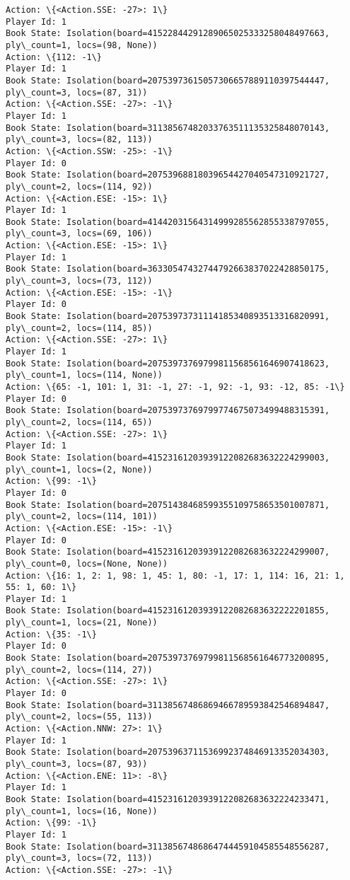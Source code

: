 \documentclass[11pt]{article}
\begin{document}
\begin{Verbatim}[commandchars=\\\{\}]
Action: \{<Action.SSE: -27>: 1\}
Player Id: 1
Book State: Isolation(board=41522844291289065025333258048497663, ply\_count=1, locs=(98, None))
Action: \{112: -1\}
Player Id: 1
Book State: Isolation(board=20753973615057306657889110397544447, ply\_count=3, locs=(87, 31))
Action: \{<Action.SSE: -27>: -1\}
Player Id: 1
Book State: Isolation(board=31138567482033763511135325848070143, ply\_count=3, locs=(82, 113))
Action: \{<Action.SSW: -25>: -1\}
Player Id: 0
Book State: Isolation(board=20753968818039654427040547310921727, ply\_count=2, locs=(114, 92))
Action: \{<Action.ESE: -15>: 1\}
Player Id: 1
Book State: Isolation(board=41442031564314999285562855338797055, ply\_count=3, locs=(69, 106))
Action: \{<Action.ESE: -15>: 1\}
Player Id: 1
Book State: Isolation(board=36330547432744792663837022428850175, ply\_count=3, locs=(73, 112))
Action: \{<Action.ESE: -15>: -1\}
Player Id: 0
Book State: Isolation(board=20753973731114185340893513316820991, ply\_count=2, locs=(114, 85))
Action: \{<Action.SSE: -27>: 1\}
Player Id: 1
Book State: Isolation(board=20753973769799811568561646907418623, ply\_count=1, locs=(114, None))
Action: \{65: -1, 101: 1, 31: -1, 27: -1, 92: -1, 93: -12, 85: -1\}
Player Id: 0
Book State: Isolation(board=20753973769799774675073499488315391, ply\_count=2, locs=(114, 65))
Action: \{<Action.SSE: -27>: 1\}
Player Id: 1
Book State: Isolation(board=41523161203939122082683632224299003, ply\_count=1, locs=(2, None))
Action: \{99: -1\}
Player Id: 0
Book State: Isolation(board=20751438468599355109758653501007871, ply\_count=2, locs=(114, 101))
Action: \{<Action.ESE: -15>: -1\}
Player Id: 0
Book State: Isolation(board=41523161203939122082683632224299007, ply\_count=0, locs=(None, None))
Action: \{16: 1, 2: 1, 98: 1, 45: 1, 80: -1, 17: 1, 114: 16, 21: 1, 55: 1, 60: 1\}
Player Id: 1
Book State: Isolation(board=41523161203939122082683632222201855, ply\_count=1, locs=(21, None))
Action: \{35: -1\}
Player Id: 0
Book State: Isolation(board=20753973769799811568561646773200895, ply\_count=2, locs=(114, 27))
Action: \{<Action.SSE: -27>: 1\}
Player Id: 0
Book State: Isolation(board=31138567486869466789593842546894847, ply\_count=2, locs=(55, 113))
Action: \{<Action.NNW: 27>: 1\}
Player Id: 1
Book State: Isolation(board=20753963711536992374846913352034303, ply\_count=3, locs=(87, 93))
Action: \{<Action.ENE: 11>: -8\}
Player Id: 1
Book State: Isolation(board=41523161203939122082683632224233471, ply\_count=1, locs=(16, None))
Action: \{99: -1\}
Player Id: 1
Book State: Isolation(board=31138567486864744459104585548556287, ply\_count=3, locs=(72, 113))
Action: \{<Action.SSE: -27>: -1\}

\end{Verbatim}
\end{document}
